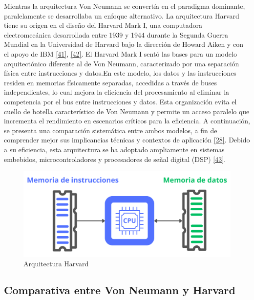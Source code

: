 \documentclass[12pt,oneside]{templates/unerthesis}
\begin{document}
Mientras la arquitectura Von Neumann se convertía en el paradigma dominante, paralelamente se desarrollaba un enfoque alternativo. La arquitectura Harvard tiene su origen en el diseño del Harvard Mark I, una computadora electromecánica desarrollada entre 1939 y 1944 durante la Segunda Guerra Mundial en la Universidad de Harvard bajo la dirección de Howard Aiken y con el apoyo de IBM \protect\hyperlink{ref-ceruzzi_history_2003}{{[}41{]}}, \protect\hyperlink{ref-williams1998history}{{[}42{]}}. El Harvard Mark I sentó las bases para un modelo arquitectónico diferente al de Von Neumann, caracterizado por una separación física entre instrucciones y datos.En este modelo, los datos y las instrucciones residen en memorias físicamente separadas, accedidas a través de buses independientes, lo cual mejora la eficiencia del procesamiento al eliminar la competencia por el bus entre instrucciones y datos. Esta organización evita el cuello de botella característico de Von Neumann y permite un acceso paralelo que incrementa el rendimiento en escenarios críticos para la eficiencia. A continuación, se presenta una comparación sistemática entre ambos modelos, a fin de comprender mejor sus implicancias técnicas y contextos de aplicación \protect\hyperlink{ref-tanenbaum_structured_2016}{{[}28{]}}. Debido a su eficiencia, esta arquitectura se ha adoptado ampliamente en sistemas embebidos, microcontroladores y procesadores de señal digital (DSP) \protect\hyperlink{ref-noergaard2012embedded}{{[}43{]}}.

\begin{figure}

{\centering \includegraphics[width=0.85\linewidth]{images/harvard} 

}

\caption{Arquitectura Harvard}\label{fig:harvard}
\end{figure}

\hypertarget{comparativa-entre-von-neumann-y-harvard}{%
\subsection{Comparativa entre Von Neumann y Harvard}\label{comparativa-entre-von-neumann-y-harvard}}
\end{document}
